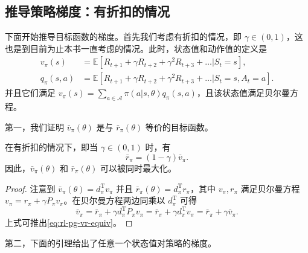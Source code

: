 \subsection{推导策略梯度：有折扣的情况}
\label{sec:rl-pg-deriv-disc}

下面开始推导目标函数的梯度。首先我们考虑有折扣的情况，即 $\gamma \in (0,1)$，这也是到目前为止本书一直考虑的情况。此时，状态值和动作值的定义是
\begin{equation}
\begin{aligned}
v_{\pi}(s) &= \mathbb{E}[R_{t+1} + \gamma R_{t+2} + \gamma^{2} R_{t+3} + \dots | S_t = s], \\
q_{\pi}(s,a) &= \mathbb{E}[R_{t+1} + \gamma R_{t+2} + \gamma^{2} R_{t+3} + \dots | S_t = s, A_t = a].
\end{aligned}
\end{equation}
并且它们满足 $v_{\pi}(s) = \sum_{a\in \mathcal{A}}\pi(a|s,\theta)q_{\pi}(s,a)$，且该状态值满足贝尔曼方程。

第一，我们证明 $\bar{v}_{\pi}(\theta)$ 是与 $\bar{r}_{\pi}(\theta)$ 等价的目标函数。

\begin{lemma}
\label{lem:rl-pg-vbar-rbar}
在有折扣的情况下，即当 $\gamma \in (0,1)$ 时，有
\begin{equation}
\bar{r}_{\pi} = (1 - \gamma) \bar{v}_{\pi}.
\label{eq:rl-pg-vr-equiv}
\end{equation}
因此，$\bar{v}_{\pi}(\theta)$ 和 $\bar{r}_{\pi}(\theta)$ 可以被同时最大化。
\end{lemma}

\begin{proof}
注意到 $\bar{v}_{\pi}(\theta) = d_{\pi}^{\mathrm{T}}v_{\pi}$ 并且 $\bar{r}_{\pi}(\theta) = d_{\pi}^{\mathrm{T}}r_{\pi}$，其中 $v_{\pi}, r_{\pi}$ 满足贝尔曼方程 $v_{\pi} = r_{\pi} + \gamma P_{\pi}v_{\pi}$。在贝尔曼方程两边同乘以 $d_{\pi}^{\mathrm{T}}$ 可得
\begin{equation}
\bar{v}_{\pi} = \bar{r}_{\pi} + \gamma d_{\pi}^{\mathrm{T}} P_{\pi} v_{\pi} = \bar{r}_{\pi} + \gamma d_{\pi}^{\mathrm{T}} v_{\pi} = \bar{r}_{\pi} + \gamma \bar{v}_{\pi}.
\end{equation}
上式可推出\cref{eq:rl-pg-vr-equiv}。
\end{proof}

第二，下面的引理给出了任意一个状态值对策略的梯度。

